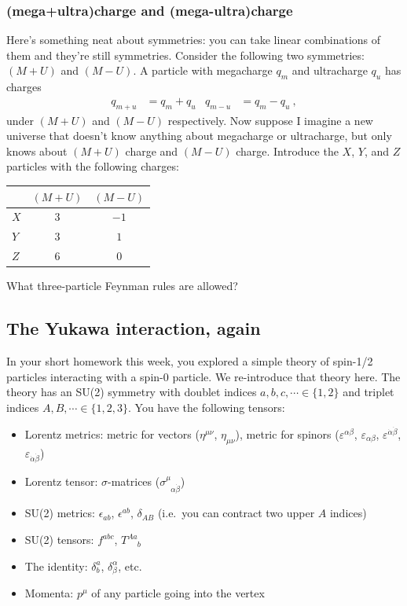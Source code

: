 \documentclass[12pt]{article}
\begin{document}
\subsubsection{(mega+ultra)charge and (mega-ultra)charge}

Here's something neat about symmetries: you can take linear combinations of them and they're still symmetries. Consider the following two symmetries: $(M+U)$ and $(M-U)$. A particle with megacharge $q_m$ and ultracharge $q_u$ has charges
\begin{align}
	q_{m+u} &= q_m + q_u
	&
	q_{m-u} &= q_m - q_u \ ,
\end{align}
under $(M+U)$ and $(M-U)$ respectively. Now suppose I imagine a new universe that doesn't know anything about megacharge or ultracharge, but only knows about $(M+U)$ charge and $(M-U)$ charge. Introduce the $X$, $Y$, and $Z$ particles with the following charges:
\begin{center}
\begin{tabular}{|l|c|c|}
\hline
    & $(M+U)$ & $(M-U)$ \\ \hline
$X$ & $3$        & $-1$        \\ \hline
$Y$ & $3$        & $1$        \\ \hline
$Z$ & $6$        & $0$        \\ \hline
\end{tabular}
\end{center}
What three-particle Feynman rules are allowed?


\subsection{The Yukawa interaction, again}

In your short homework this week, you explored a simple theory of spin-1/2 particles interacting with a spin-0 particle. We re-introduce that theory here. The theory has an SU(2) symmetry with doublet indices $a,b,c,\cdots \in \{1,2\}$ and triplet indices $A,B,\cdots \in \{1,2,3\}$. You have the following tensors:

\begin{itemize}
	\item {Lorentz metrics}: metric for vectors ($\eta^{\mu\nu}$, $\eta_{\mu\nu}$), metric for spinors ($\varepsilon^{\alpha\beta}$, $\varepsilon_{\alpha\beta}$, $\varepsilon^{\dot\alpha\dot\beta}$, $\varepsilon_{\dot\alpha\dot\beta}$)
	\item {Lorentz tensor}: $\sigma$-matrices ($\sigma^{\mu}_{\phantom\mu \alpha\dot\beta}$)
	\item SU(2) metrics: $\epsilon_{ab}$, $\epsilon^{ab}$, $\delta_{AB}$ (i.e.\ you can contract two upper $A$ indices)
	\item SU(2) tensors: $f^{abc}$, $T^{Aa}_{\phantom{Aa}b}$
	\item The identity: $\delta^a_b$, $\delta^\alpha_\beta$, etc.
	\item Momenta: $p^\mu$ of any particle going into the vertex
\end{itemize}
\end{document}
